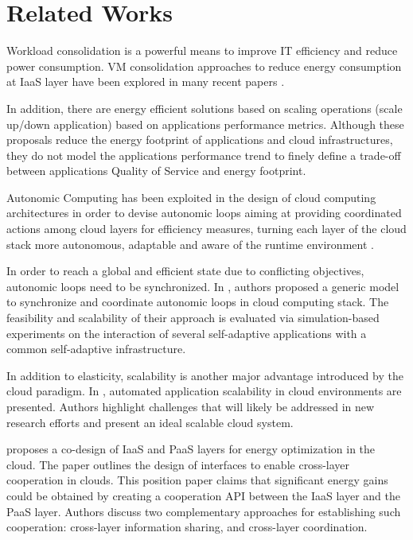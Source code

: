 \section{Related Works}
\label{sec: relworks}

Workload consolidation is a powerful means to improve IT efficiency and reduce power consumption.
VM consolidation approaches to reduce energy consumption at IaaS layer have been explored in many recent papers \cite{Cardosa} \cite{ITProf1} \cite{Schroder} \cite{Hermenier2009} \cite{sheikhalishahi_energy_2011} \cite{sheikhalishahi_multi-capacity_2014} \cite{dupont2015plug4green}.

In addition, there are energy efficient solutions based on scaling operations (scale up/down application) based on applications performance metrics.
Although these proposals reduce the energy footprint of applications and cloud infrastructures, they do not model the applications performance trend to finely define a trade-off between applications Quality of Service and energy footprint.

Autonomic Computing has been exploited in the design of cloud computing architectures in order to devise autonomic loops aiming at providing coordinated actions among cloud layers for efficiency measures, turning each layer of the cloud stack more autonomous, adaptable and aware of the runtime environment \cite{alvares_de_oliveira_synchronization_2012} \cite{de_oliveira_self-management_2012}  \cite{de_oliveira_framework_2013}.

In order to reach a global and efficient state due to conflicting objectives, autonomic loops need to be synchronized.
In \cite{alvares_de_oliveira_synchronization_2012}, authors proposed a generic model to synchronize and coordinate autonomic loops in cloud computing stack. 
The feasibility and scalability of their approach is evaluated via simulation-based experiments on the interaction of several self-adaptive applications with a common self-adaptive infrastructure.

In addition to elasticity, scalability is another major advantage introduced by the cloud paradigm.
In \cite{vaquero_dynamically_2011}, automated application scalability in cloud environments are presented.
Authors highlight challenges that will likely be addressed in new research efforts and present an ideal scalable cloud system.

\cite{carpen-amarie_towards_2014} proposes a co-design of IaaS and PaaS layers for energy optimization in the cloud. The paper outlines the design of interfaces to enable cross-layer cooperation in clouds. This position paper claims that significant energy gains could be obtained by creating a cooperation API between the IaaS layer and the PaaS layer. Authors discuss two complementary approaches for establishing such cooperation: cross-layer information sharing, and cross-layer coordination.


